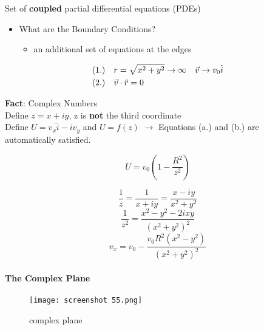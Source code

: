 \documentclass[svgnames]{article}   	%
\begin{document}
\begin{tcolorbox}[colback = red!5!white, colframe = red!50!black, title
  = Solving (a) and (b) ]
  
  Set of \textbf{coupled} partial differential equations (PDEs) 

  \begin{itemize}
    \item What are the Boundary Conditions? 
    \begin{itemize}
      \item an additional set of equations at the edges
    \end{itemize}
  \end{itemize}

  \begin{align*}
    &(1.) \hspace{10px} r = \sqrt{x^2 + y^2} \rightarrow \infty \hspace{10px}
    \vec{v} \rightarrow v_0 \hat{i} \\
    &(2.) \hspace{10px} \vec{v} \cdot \hat{r} = 0
  \end{align*}
  
 \textbf{Fact}: Complex Numbers \\
 Define $z = x + iy$, z is \textbf{not} the third coordinate\\
 Define $U = v_x \hat{i} - iv_y$ and $U = f(z)$ $\rightarrow$ Equations (a.)
 and
 (b.) are automatically satisfied. 

\end{tcolorbox}

\begin{tcolorbox}[colback = blue!5!white, colframe = blue!50!black, title
  = Solution]
  \[
  U = v_0\left(1-\frac{R^2}{z^2}\right)
  \]

  \[
  \frac{1}{z} = \frac{1}{x+iy} = \frac{x-iy}{x^2 + y^2}
  \]
  \[
  \frac{1}{z^2} = \frac{x^2 - y^2 - 2ixy}{(x^2 + y^2)^2}
  \]
  \[
  v_x = v_0 - \frac{v_0R^2(x^2 - y^2)}{(x^2 + y^2)^2}
  \]
  
\end{tcolorbox}

\paragraph{The Complex Plane}

\begin{figure}[H]
  \centering
    \texttt{[image: screenshot 55.png]}
    \caption{complex plane}
\end{figure}
\end{document}
